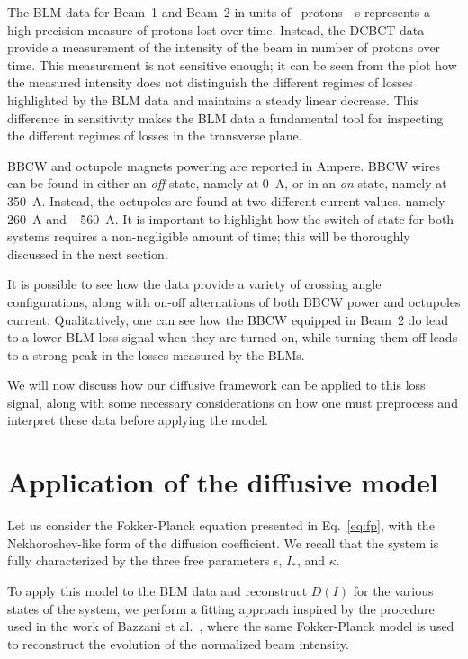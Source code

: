 The BLM data for Beam~1 and Beam~2 in units of \SI{}{protons \per s} represents a high-precision measure of protons lost over time. Instead, the DCBCT data provide a measurement of the intensity of the beam in number of protons over time. This measurement is not sensitive enough; it can be seen from the plot how the measured intensity does not distinguish the different regimes of losses highlighted by the BLM data and maintains a steady linear decrease. This difference in sensitivity makes the BLM data a fundamental tool for inspecting the different regimes of losses in the transverse plane.  

BBCW and octupole magnets powering are reported in Ampere. BBCW wires can be found in either an \textit{off} state, namely at \SI{0}{\ampere}, or in an \textit{on} state, namely at \SI{350}{\ampere}. Instead, the octupoles are found at two different current values, namely \SI{260}{\ampere} and \SI{-560}{\ampere}. It is important to highlight how the switch of state for both systems requires a non-negligible amount of time; this will be thoroughly discussed in the next section.

It is possible to see how the data provide a variety of crossing angle configurations, along with on-off alternations of both BBCW power and octupoles current. Qualitatively, one can see how the BBCW equipped in Beam~2 do lead to a lower BLM loss signal when they are turned on, while turning them off leads to a strong peak in the losses measured by the BLMs.

We will now discuss how our diffusive framework can be applied to this loss signal, along with some necessary considerations on how one must preprocess and interpret these data before applying the model. 

\section{Application of the diffusive model}\label{sec:5:wire-model}

Let us consider the Fokker-Planck equation presented in Eq.~\eqref{eq:fp}, with the Nekhoroshev-like form of the diffusion coefficient. We recall that the system is fully characterized by the three free parameters $\epsilon$, $I_\ast$, and $\kappa$.

To apply this model to the BLM data and reconstruct $D(I)$ for the various states of the system, we perform a fitting approach inspired by the procedure used in the work of Bazzani et al.~\cite{bazzani2020diffusion}, where the same Fokker-Planck model is used to reconstruct the evolution of the normalized beam intensity.

